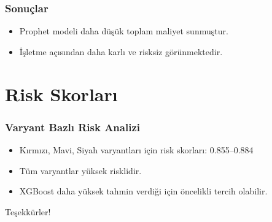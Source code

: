 \documentclass[12pt]{beamer}
\begin{document}
\begin{frame}
  \frametitle{Sonuçlar}
  \begin{itemize}
    \item Prophet modeli daha düşük toplam maliyet sunmuştur.
    \item İşletme açısından daha karlı ve risksiz görünmektedir.
  \end{itemize}
\end{frame}

\section{Risk Skorları}
\begin{frame}
  \frametitle{Varyant Bazlı Risk Analizi}
  \begin{itemize}
    \item Kırmızı, Mavi, Siyah varyantları için risk skorları: 0.855–0.884
    \item Tüm varyantlar yüksek risklidir.
    \item XGBoost daha yüksek tahmin verdiği için öncelikli tercih olabilir.
  \end{itemize}
\end{frame}

\begin{frame}
  \centering
  \Huge Teşekkürler!
\end{frame}
\end{document}
